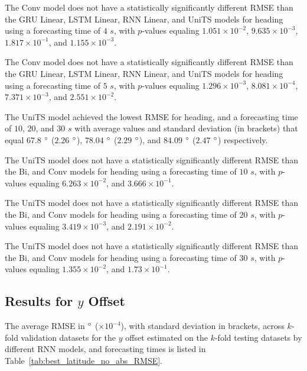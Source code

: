 \documentclass[preprint,12pt]{elsarticle}
\begin{document}
The Conv model does not have a statistically significantly different RMSE than the GRU Linear, LSTM Linear, RNN Linear, and UniTS models for heading using a forecasting time of $4$ $s$, with $p$-values equaling $1.051 \times 10^{-2}$, $9.635 \times 10^{-3}$, $1.817 \times 10^{-1}$, and $1.155 \times 10^{-3}$.

The Conv model does not have a statistically significantly different RMSE than the GRU Linear, LSTM Linear, RNN Linear, and UniTS models for heading using a forecasting time of $5$ $s$, with $p$-values equaling $1.296 \times 10^{-3}$, $8.081 \times 10^{-4}$, $7.371 \times 10^{-3}$, and $2.551 \times 10^{-2}$.

The UniTS model achieved the lowest RMSE for heading, and a forecasting time of $10$, $20$, and $30$ $s$ with average values and standard deviation (in brackets) that equal $67.8$ $\degree$ ($2.26$ $\degree$), $78.04$ $\degree$ ($2.29$ $\degree$), and $84.09$ $\degree$ ($2.47$ $\degree$) respectively.

The UniTS model does not have a statistically significantly different RMSE than the Bi, and Conv models for heading using a forecasting time of $10$ $s$, with $p$-values equaling $6.263 \times 10^{-2}$, and $3.666 \times 10^{-1}$.

The UniTS model does not have a statistically significantly different RMSE than the Bi, and Conv models for heading using a forecasting time of $20$ $s$, with $p$-values equaling $3.419 \times 10^{-3}$, and $2.191 \times 10^{-2}$.

The UniTS model does not have a statistically significantly different RMSE than the Bi, and Conv models for heading using a forecasting time of $30$ $s$, with $p$-values equaling $1.355 \times 10^{-2}$, and $1.73 \times 10^{-1}$.

\subsection{Results for $y$ Offset}

The average RMSE in $\degree$ ($\times 10^{-4}$), with standard deviation in brackets, across $k$-fold validation datasets for the $y$ offset estimated on the $k$-fold testing datasets by different RNN models, and forecasting times is listed in Table~\ref{tab:best_latitude_no_abs_RMSE}.
\end{document}
